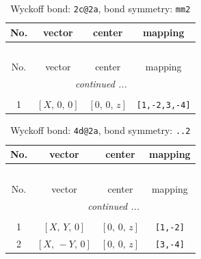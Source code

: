 \documentclass[fleqn,8pt]{jsarticle}
\begin{document}
\renewcommand{\arraystretch}{1.2}
\begin{longtable}{cccc}
\caption{Wyckoff bond: {\tt 2c@2a}, bond symmetry: {\tt mm2}}
 \\
 \hline \hline
No. & vector & center & mapping \\ \hline \endfirsthead

\multicolumn{3}{l}{\tablename\ \thetable{}} \\
 \hline \hline
No. & vector & center & mapping \\ \hline \endhead

 \hline \hline
\multicolumn{3}{r}{\footnotesize\it continued ...} \\ \endfoot

 \hline \hline
\multicolumn{3}{r}{} \\ \endlastfoot

1 & $\left[ X,\, 0,\, 0 \right]$ & $\left[ 0,\, 0,\, z \right]$ & {\tt [1,-2,3,-4]} \\
\end{longtable}
\renewcommand{\arraystretch}{1.2}
\begin{longtable}{cccc}
\caption{Wyckoff bond: {\tt 4d@2a}, bond symmetry: {\tt ..2}}
 \\
 \hline \hline
No. & vector & center & mapping \\ \hline \endfirsthead

\multicolumn{3}{l}{\tablename\ \thetable{}} \\
 \hline \hline
No. & vector & center & mapping \\ \hline \endhead

 \hline \hline
\multicolumn{3}{r}{\footnotesize\it continued ...} \\ \endfoot

 \hline \hline
\multicolumn{3}{r}{} \\ \endlastfoot

1 & $\left[ X,\, Y,\, 0 \right]$ & $\left[ 0,\, 0,\, z \right]$ & {\tt [1,-2]} \\ \hline
2 & $\left[ X,\, - Y,\, 0 \right]$ & $\left[ 0,\, 0,\, z \right]$ & {\tt [3,-4]} \\
\end{longtable}
\renewcommand{\arraystretch}{1.2}
\end{document}
